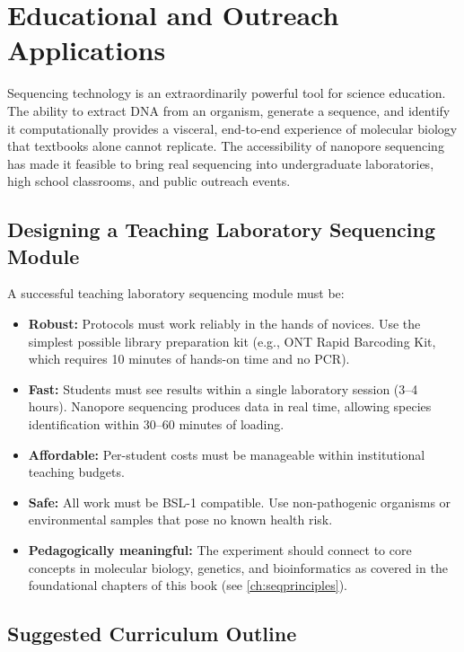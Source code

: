 \section{Educational and Outreach Applications}
\label{sec:accessible:education}

Sequencing technology is an extraordinarily powerful tool for science education. The ability to extract DNA from an organism, generate a sequence, and identify it computationally provides a visceral, end-to-end experience of molecular biology that textbooks alone cannot replicate. The accessibility of nanopore sequencing has made it feasible to bring real sequencing into undergraduate laboratories, high school classrooms, and public outreach events.

\subsection{Designing a Teaching Laboratory Sequencing Module}
\label{subsec:accessible:teachlab}

A successful teaching laboratory sequencing module must be:

\begin{itemize}[itemsep=2pt]
  \item \textbf{Robust:} Protocols must work reliably in the hands of novices. Use the simplest possible library preparation kit (e.g., \acrshort{ONT} Rapid Barcoding Kit, which requires 10 minutes of hands-on time and no \acrshort{PCR}).
  \item \textbf{Fast:} Students must see results within a single laboratory session (3--4 hours). Nanopore sequencing produces data in real time, allowing species identification within 30--60 minutes of loading.
  \item \textbf{Affordable:} Per-student costs must be manageable within institutional teaching budgets.
  \item \textbf{Safe:} All work must be BSL-1 compatible. Use non-pathogenic organisms or environmental samples that pose no known health risk.
  \item \textbf{Pedagogically meaningful:} The experiment should connect to core concepts in molecular biology, genetics, and bioinformatics as covered in the foundational chapters of this book (see \cref{ch:seqprinciples}).
\end{itemize}

\subsection{Suggested Curriculum Outline}
\label{subsec:accessible:curriculum}

